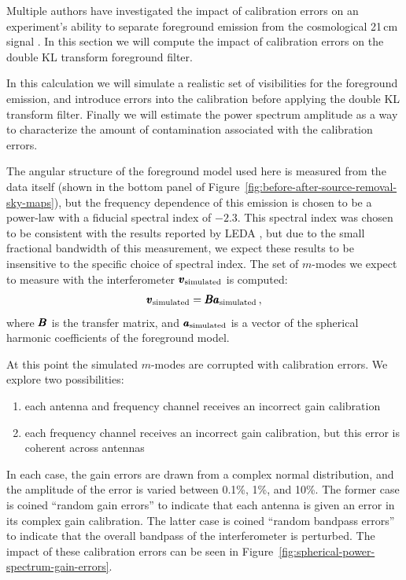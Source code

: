 \begin{bibunit}
Multiple authors have investigated the impact of calibration errors on an experiment's ability to
separate foreground emission from the cosmological 21\,cm signal \citep{2016MNRAS.461.3135B,
2017MNRAS.470.1849E}. In this section we will compute the impact of calibration errors on the double
KL transform foreground filter.

In this calculation we will simulate a realistic set of visibilities for the foreground emission,
and introduce errors into the calibration before applying the double KL transform filter. Finally we
will estimate the power spectrum amplitude as a way to characterize the amount of contamination
associated with the calibration errors.

The angular structure of the foreground model used here is measured from the data itself (shown in
the bottom panel of Figure~\ref{fig:before-after-source-removal-sky-maps}), but the frequency
dependence of this emission is chosen to be a power-law with a fiducial spectral index of $-2.3$.
This spectral index was chosen to be consistent with the results reported by LEDA
\citep{2018MNRAS.478.4193P}, but due to the small fractional bandwidth of this measurement, we
expect these results to be insensitive to the specific choice of spectral index. The set of
$m$-modes we expect to measure with the interferometer $\pmb v_\text{simulated}$ is computed:
\begin{equation}
    \pmb v_\text{simulated} = \pmb B\pmb a_\text{simulated}\,,
\end{equation}
where $\pmb B$ is the transfer matrix, and $\pmb a_\text{simulated}$ is a vector of the spherical
harmonic coefficients of the foreground model.

At this point the simulated $m$-modes are corrupted with calibration errors. We explore two
possibilities:
\begin{enumerate}
    \item each antenna and frequency channel receives an incorrect gain calibration
    \item each frequency channel receives an incorrect gain calibration, but this error is coherent
        across antennas
\end{enumerate}
In each case, the gain errors are drawn from a complex normal distribution, and the amplitude of the
error is varied between 0.1\%, 1\%, and 10\%. The former case is coined ``random gain errors'' to
indicate that each antenna is given an error in its complex gain calibration. The latter case is
coined ``random bandpass errors'' to indicate that the overall bandpass of the interferometer is
perturbed. The impact of these calibration errors can be seen in
Figure~\ref{fig:spherical-power-spectrum-gain-errors}.


\end{bibunit}
